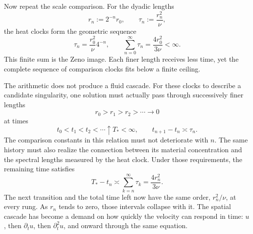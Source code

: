 
Now repeat the scale comparison.
For the dyadic lengths
\[
  r_n:=2^{-n}r_0,
  \qquad
  \tau_n:=\frac{r_n^2}{\nu},
\]
the heat clocks form the geometric sequence
\[
  \tau_n
  =
  \frac{r_0^2}{\nu}4^{-n},
  \qquad
  \sum_{n=0}^{\infty}\tau_n
  =
  \frac{4r_0^2}{3\nu}
  <
  \infty.
\]
This finite sum is the Zeno image.
Each finer length receives less time, yet the complete sequence of comparison clocks fits below a finite ceiling.

The arithmetic does not produce a fluid cascade.
For these clocks to describe a candidate singularity, one \NavierStokes{} solution must actually pass through successively finer lengths
\[
  r_0>r_1>r_2>\cdots\longrightarrow0
\]
at times
\[
  t_0<t_1<t_2<\cdots\uparrow T_*<\infty,
  \qquad
  t_{n+1}-t_n\asymp\tau_n.
\]
The comparison constants in this relation must not deteriorate with \(n\).
The same history must also realize the connection between its material concentration and the spectral lengths measured by the heat clock.
Under those requirements, the remaining time satisfies
\[
  T_*-t_n
  \asymp
  \sum_{k=n}^{\infty}\tau_k
  =
  \frac{4r_n^2}{3\nu}.
\]
The next transition and the total time left now have the same order, \(r_n^2/\nu\), at every rung.
As \(r_n\) tends to zero, those intervals collapse with it.
The spatial cascade has become a demand on how quickly the velocity can respond in time: \(u\), then \(\partial_tu\), then \(\partial_t^2u\), and onward through the same equation.
